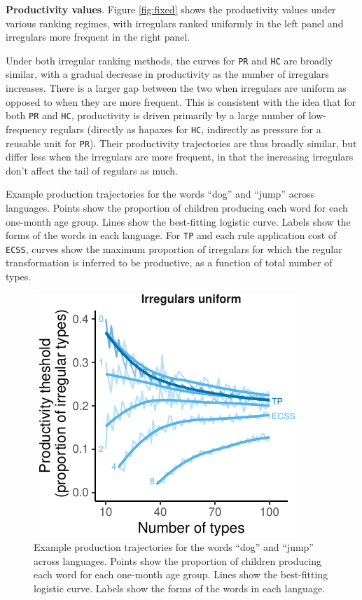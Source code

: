 \documentclass[
   11pt,
       ]{book}
\begin{document}
\textbf{Productivity values}. Figure \ref{fig:fixed} shows the productivity
values under various ranking regimes, with irregulars ranked uniformly in the
left panel and irregulars more frequent in the right panel.

Under both irregular ranking methods, the curves for \texttt{PR} and \texttt{HC} are broadly
similar, with a gradual decrease in productivity as the number of irregulars
increases. There is a larger gap between the two when irregulars are uniform as
opposed to when they are more frequent. This is consistent with the idea that
for both \texttt{PR} and \texttt{HC}, productivity is driven primarily by a large number of
low-frequency regulars (directly as hapaxes for \texttt{HC}, indirectly as pressure for
a reusable unit for \texttt{PR}). Their productivity trajectories are thus broadly
similar, but differ less when the irregulars are more frequent, in that the
increasing irregulars don't affect the tail of regulars as much.

Example production trajectories for the words ``dog'' and ``jump'' across languages. Points show the proportion of children producing each word for each one-month age group. Lines show the best-fitting logistic curve. Labels show the forms of the words in each language. For \texttt{TP} and each rule application cost of \texttt{ECSS}, curves
show the maximum proportion of irregulars for which the regular transformation
is inferred to be productive, as a function of total number of types.

\begin{figure}

{\centering \includegraphics[width=0.5\linewidth]{04-prod-comp/figures/thresholds-ecss-tp-1} 

}

\caption{Example production trajectories for the words ``dog'' and ``jump'' across languages. Points show the proportion of children producing each word for each one-month age group. Lines show the best-fitting logistic curve. Labels show the forms of the words in each language.}\label{fig:thresholds-ecss-tp}
\end{figure}
\end{document}
